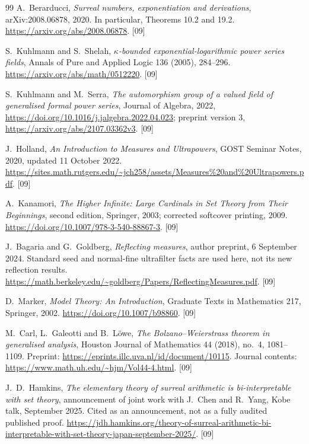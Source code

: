 \documentclass[11pt,letterpaper]{article}
\numberwithin{equation}{section}
\theoremstyle{definition}
\theoremstyle{remark}
\newcommand{\src}[1]{\textup{\textsf{\small[#1]}}}%
\begin{document}
\begin{thebibliography}{99}
A.~Berarducci, \emph{Surreal numbers, exponentiation and derivations},
arXiv:2008.06878, 2020. In particular, Theorems 10.2 and 19.2.
\url{https://arxiv.org/abs/2008.06878}. \src{09}

S.~Kuhlmann and S.~Shelah, \emph{$\kappa$-bounded exponential-logarithmic
power series fields}, Annals of Pure and Applied Logic 136 (2005), 284--296.
\url{https://arxiv.org/abs/math/0512220}. \src{09}

S.~Kuhlmann and M.~Serra, \emph{The automorphism group of a valued field
of generalised formal power series}, Journal of Algebra, 2022,
\url{https://doi.org/10.1016/j.jalgebra.2022.04.023};
preprint version 3, \url{https://arxiv.org/abs/2107.03362v3}. \src{09}

J.~Holland, \emph{An Introduction to Measures and Ultrapowers},
GOST Seminar Notes, 2020, updated 11 October 2022.
\url{https://sites.math.rutgers.edu/~jch258/assets/Measures%20and%20Ultrapowers.pdf}.
\src{09}

A.~Kanamori, \emph{The Higher Infinite: Large Cardinals in Set Theory
from Their Beginnings}, second edition, Springer, 2003; corrected
softcover printing, 2009.
\url{https://doi.org/10.1007/978-3-540-88867-3}. \src{09}

J.~Bagaria and G.~Goldberg, \emph{Reflecting measures}, author preprint,
6 September 2024. Standard seed and normal-fine ultrafilter facts are
used here, not its new reflection results.
\url{https://math.berkeley.edu/~goldberg/Papers/ReflectingMeasures.pdf}.
\src{09}

D.~Marker, \emph{Model Theory: An Introduction}, Graduate Texts in
Mathematics 217, Springer, 2002.
\url{https://doi.org/10.1007/b98860}. \src{09}

M.~Carl, L.~Galeotti and B.~L\"owe,
\emph{The Bolzano--Weierstrass theorem in generalised analysis},
Houston Journal of Mathematics 44 (2018), no.~4, 1081--1109.
Preprint: \url{https://eprints.illc.uva.nl/id/document/10115}.
Journal contents: \url{https://www.math.uh.edu/~hjm/Vol44-4.html}. \src{09}

J.~D.~Hamkins, \emph{The elementary theory of surreal arithmetic is
bi-interpretable with set theory}, announcement of joint work with
J.~Chen and R.~Yang, Kobe talk, September 2025. Cited as an announcement,
not as a fully audited published proof.
\url{https://jdh.hamkins.org/theory-of-surreal-arithmetic-bi-interpretable-with-set-theory-japan-september-2025/}.
\src{09}


\end{thebibliography}
\end{document}
